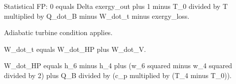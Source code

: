 Statistical FP:  
0 equals Delta exergy_out plus 1 minus T_0 divided by T multiplied by Q_dot_B minus W_dot_t minus exergy_loss.  

Adiabatic turbine condition applies.  

W_dot_t equals W_dot_HP plus W_dot_V.  

W_dot_HP equals h_6 minus h_4 plus (w_6 squared minus w_4 squared divided by 2) plus Q_B divided by (c_p multiplied by (T_4 minus T_0)).